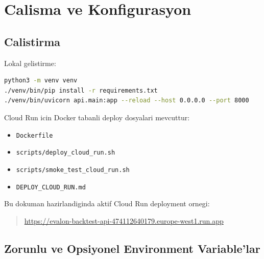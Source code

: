 \documentclass[11pt,a4paper]{article}
\begin{document}
\section{Calisma ve Konfigurasyon}

\subsection{Calistirma}

Lokal gelistirme:

\begin{lstlisting}[language=bash]
python3 -m venv venv
./venv/bin/pip install -r requirements.txt
./venv/bin/uvicorn api.main:app --reload --host 0.0.0.0 --port 8000
\end{lstlisting}

Cloud Run icin Docker tabanli deploy dosyalari mevcuttur:

\begin{itemize}[leftmargin=1.5em]
    \item \texttt{Dockerfile}
    \item \texttt{scripts/deploy\_cloud\_run.sh}
    \item \texttt{scripts/smoke\_test\_cloud\_run.sh}
    \item \texttt{DEPLOY\_CLOUD\_RUN.md}
\end{itemize}

Bu dokuman hazirlandiginda aktif Cloud Run deployment ornegi:

\begin{quote}
\url{https://evalon-backtest-api-474112640179.europe-west1.run.app}
\end{quote}

\subsection{Zorunlu ve Opsiyonel Environment Variable'lar}
\end{document}
